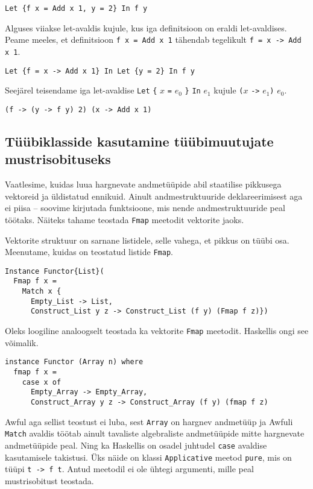 \documentclass[12pt]{article}
\begin{document}
        \begin{verbatim}Let {f x = Add x 1, y = 2} In f y\end{verbatim}

        Alguses viiakse let-avaldis kujule, kus iga definitsioon on eraldi let-avaldises. Peame meeles, et definitsioon \verb!f x = Add x 1! tähendab tegelikult \verb!f = x -> Add x 1!.

        \begin{verbatim}Let {f = x -> Add x 1} In Let {y = 2} In f y\end{verbatim}

        Seejärel teisendame iga let-avaldise \verb!Let! \verb!{! $x$ \verb!=! $e_0$ \verb!}! \verb!In! $e_1$ kujule \verb!(!$x$ \verb!->! $e_1$\verb!)! $e_0$.

        \begin{verbatim}(f -> (y -> f y) 2) (x -> Add x 1)\end{verbatim}
    \subsection{Tüübiklasside kasutamine tüübimuutujate mustrisobituseks}\label{tyybiklassihakk}
      Vaatlesime, kuidas luua hargnevate andmetüüpide abil staatilise pikkusega vektoreid ja üldistatud ennikuid. Ainult andmestruktuuride deklareerimisest aga ei piisa -- soovime kirjutada funktsioone, mis nende andmestruktuuride peal töötaks. Näiteks tahame teostada \verb!Fmap! meetodit vektorite jaoks.

      Vektorite struktuur on sarnane listidele, selle vahega, et pikkus on tüübi osa. Meenutame, kuidas on teostatud listide \verb!Fmap!.

      \begin{verbatim}Instance Functor{List}(
  Fmap f x =
    Match x {
      Empty_List -> List,
      Construct_List y z -> Construct_List (f y) (Fmap f z)})\end{verbatim}

      Oleks loogiline analoogselt teostada ka vektorite \verb!Fmap! meetodit. Haskellis ongi see võimalik.

      \begin{verbatim}instance Functor (Array n) where
  fmap f x =
    case x of
      Empty_Array -> Empty_Array,
      Construct_Array y z -> Construct_Array (f y) (fmap f z)\end{verbatim}

      Awful aga sellist teostust ei luba, sest \verb!Array! on hargnev andmetüüp ja Awfuli \verb!Match! avaldis töötab ainult tavaliste algebraliste andmetüüpide mitte hargnevate andmetüüpide peal. Ning ka Haskellis on osadel juhtudel \verb!case! avaldise kasutamisele takistusi. Üks näide on klassi \verb!Applicative! meetod \verb!pure!, mis on tüüpi \verb!t -> f t!. Antud meetodil ei ole ühtegi argumenti, mille peal mustrisobitust teostada.
\end{document}
